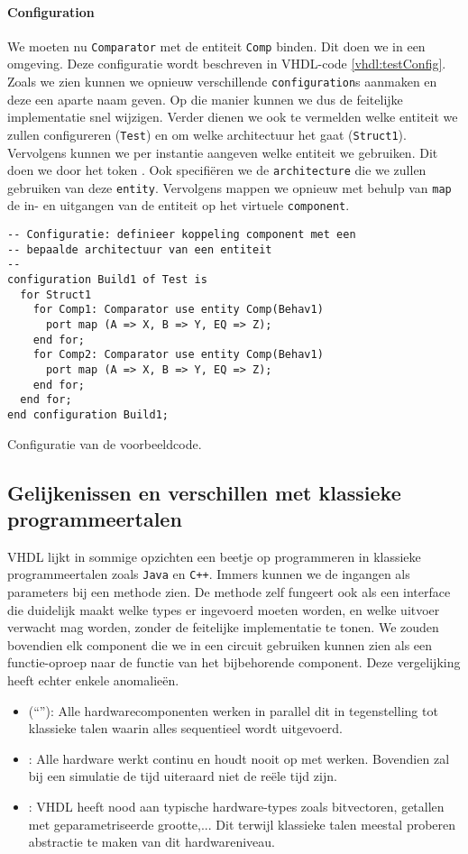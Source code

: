 \paragraph{Configuration} We moeten nu \texttt{Comparator} met de entiteit \texttt{Comp} binden. Dit doen we in een  omgeving. Deze configuratie wordt beschreven in VHDL-code \ref{vhdl:testConfig}. Zoals we zien kunnen we opnieuw verschillende \texttt{configuration}s aanmaken en deze een aparte naam geven. Op die manier kunnen we dus de feitelijke implementatie snel wijzigen. Verder dienen we ook te vermelden welke entiteit we zullen configureren (\texttt{Test}) en om welke architectuur het gaat (\texttt{Struct1}). Vervolgens kunnen we per instantie aangeven welke entiteit we gebruiken. Dit doen we door het token . Ook specifi\"eren we de \texttt{architecture} die we zullen gebruiken van deze \texttt{entity}. Vervolgens mappen we opnieuw met behulp van \texttt{map} de in- en uitgangen van de entiteit op het virtuele \texttt{component}.
\begin{vhdlcode}
\begin{lstlisting}
-- Configuratie: definieer koppeling component met een
-- bepaalde architectuur van een entiteit
--
configuration Build1 of Test is
  for Struct1
    for Comp1: Comparator use entity Comp(Behav1)
      port map (A => X, B => Y, EQ => Z);
    end for;
    for Comp2: Comparator use entity Comp(Behav1)
      port map (A => X, B => Y, EQ => Z);
    end for;
  end for;
end configuration Build1;
\end{lstlisting}
\caption{Configuratie van de voorbeeldcode.}
\label{vhdl:testConfig}
\end{vhdlcode}
\subsection{Gelijkenissen en verschillen met klassieke programmeertalen}
VHDL lijkt in sommige opzichten een beetje op programmeren in klassieke programmeertalen zoals \texttt{Java} en \texttt{C++}. Immers kunnen we de ingangen als parameters bij een methode zien. De methode zelf fungeert ook als een interface die duidelijk maakt welke types er ingevoerd moeten worden, en welke uitvoer verwacht mag worden, zonder de feitelijke implementatie te tonen. We zouden bovendien elk component die we in een circuit gebruiken kunnen zien als een functie-oproep naar de functie van het bijbehorende component. Deze vergelijking heeft echter enkele anomalie\"en.
\begin{itemize}
 \item {} (``''): Alle hardwarecomponenten werken in parallel dit in tegenstelling tot klassieke talen waarin alles sequentieel wordt uitgevoerd.
 \item {}: Alle hardware werkt continu en houdt nooit op met werken. Bovendien zal bij een simulatie de tijd uiteraard niet de re\"ele tijd zijn.
 \item {}: VHDL heeft nood aan typische hardware-types zoals bitvectoren, getallen met geparametriseerde grootte,... Dit terwijl klassieke talen meestal proberen abstractie te maken van dit hardwareniveau.
\end{itemize}

